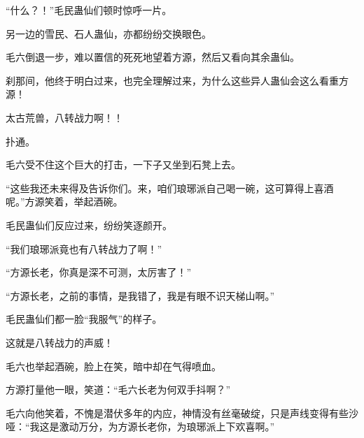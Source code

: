 \begin{this_body}
“什么？！”毛民蛊仙们顿时惊呼一片。

另一边的雪民、石人蛊仙，亦都纷纷交换眼色。

毛六倒退一步，难以置信的死死地望着方源，然后又看向其余蛊仙。

刹那间，他终于明白过来，也完全理解过来，为什么这些异人蛊仙会这么看重方源！

太古荒兽，八转战力啊！！

扑通。

毛六受不住这个巨大的打击，一下子又坐到石凳上去。

“这些我还未来得及告诉你们。来，咱们琅琊派自己喝一碗，这可算得上喜酒呢。”方源笑着，举起酒碗。

毛民蛊仙们反应过来，纷纷笑逐颜开。

“我们琅琊派竟也有八转战力了啊！”

“方源长老，你真是深不可测，太厉害了！”

“方源长老，之前的事情，是我错了，我是有眼不识天梯山啊。”

毛民蛊仙们都一脸“我服气”的样子。

这就是八转战力的声威！

毛六也举起酒碗，脸上在笑，暗中却在气得喷血。

方源打量他一眼，笑道：“毛六长老为何双手抖啊？”

毛六向他笑着，不愧是潜伏多年的内应，神情没有丝毫破绽，只是声线变得有些沙哑：“我这是激动万分，为方源长老你，为琅琊派上下欢喜啊。”

\end{this_body}

